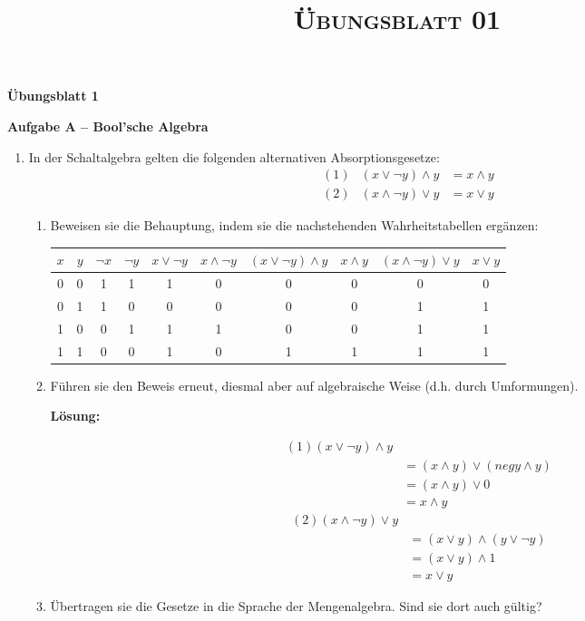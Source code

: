 \documentclass[paper=a4,fontsize=11pt]{scrartcl}%
\title{	
\normalfont \normalsize 
\textsc{Übungsblatt 01}
}
\numberwithin{equation}{section}
\newenvironment{solution}
	{
		\color{Blue}
		\textbf{Lösung:}
	}{}
\begin{document}
\vspace*{-1cm}
\begin{center}
\Large{\textbf{Übungsblatt 1}}
\end{center}
\vspace*{-1cm}
\begin{center}\Large{\textbf{Aufgabe A -- Bool'sche Algebra}}\end{center}
\vspace*{-.8cm}
\begin{enumerate}
	\item In der Schaltalgebra gelten die folgenden alternativen Absorptionsgesetze:
	\begin{align*}
		(1) & (x \lor \neg y) \land y &= x \land y\\
		(2) & (x \land \neg y) \lor y &= x \lor y
	\end{align*}
	\begin{enumerate}
		\item Beweisen sie die Behauptung, indem sie die nachstehenden Wahrheitstabellen ergänzen:
	\begin{center}
	\begin{table}[ht]
	\centering
\begin{tabular}{|c|c|c|c|c|c|c|c|c|c|}
\hline
 $x$ & $y$ & $\neg x$ & $\neg y$ & $x \lor \neg y$ & $x \land \neg y$ & $(x \lor \neg y) \land y$ & $x \land y$ & $(x \land \neg y) \lor y$ & $x \lor y$ \\ \hline
0 & 0 & 1 & 1 & 1 & 0 & 0 & 0 & 0 & 0 \\ \hline
0 & 1 & 1 & 0 & 0 & 0 & 0 & 0 & 1 & 1 \\ \hline
1 & 0 & 0 & 1 & 1 & 1 & 0 & 0 & 1 & 1 \\ \hline
1 & 1 & 0 & 0 & 1 & 0 & 1 & 1 & 1 & 1 \\ \hline
\end{tabular}
\end{table}
	\end{center}
		\item Führen sie den Beweis erneut, diesmal aber auf algebraische Weise (d.h. durch Umformungen).
		
		\begin{solution}
		
		\begin{align*}
		(1) (x \lor \neg y) \land y &\\
		&= (x \land y) \lor (neg y \land y)\\
		&= (x \land y) \lor 0\\
		&= x \land y
		\end{align*}
		\begin{align*}
		(2) (x \land \neg y) \lor y & \\
		&= (x \lor y) \land (y \lor \neg y)\\
		&= (x \lor y) \land 1\\
		&= x \lor y
		\end{align*}
		\end{solution}
		\item Übertragen sie die Gesetze in die Sprache der Mengenalgebra. Sind sie dort auch gültig?
		

\end{enumerate}
\end{enumerate}
\end{document}
